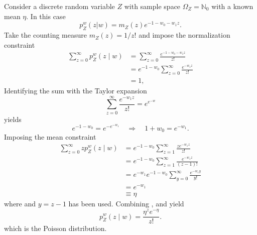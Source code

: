 \begin{example}
	Consider a discrete random variable $Z$ with sample space $\Omega_Z = \mathbb{N}_0$ with a known mean $\eta$. In this case
	\begin{equation}
		p_{Z}^w(z|w) = m_Z(z) e^{-1-w_0 - w_1 z}.
		\label{eq:qsa}
	\end{equation}
	Take the counting measure $m_Z(z) = 1/z!$ and impose the normalization constraint
	\begin{equation}
		\begin{split}
			\sum_{z=0}^{\infty} p_{Z}^w(z \mid w) &= \sum_{z=0}^{\infty} \frac{e^{-1-w_0 - w_1 z}}{z!}\\
			& = e^{-1-w_0} \sum_{z=0}^{\infty} \frac{e^{-w_1 z}}{z!}\\
			& = 1,
		\end{split}
		\label{eq:asd}
	\end{equation}
	Identifying the sum with the Taylor expansion
	\begin{equation}
		\sum_{z=0}^{\infty} \frac{e^{-w_1 z}}{z!} = e^{e^{-w}}
	\end{equation}
	yields
	\begin{equation}
		e^{-1-w_0} = e^{-e^{-w_1}} \quad \Rightarrow \quad 1+w_0 = e^{-w_1}.
		\label{eq:qwe}
	\end{equation}
	Imposing the mean constraint
	\begin{equation}
		\begin{split}
			\sum_{z=0}^{\infty} z p_{Z}^w(z \mid w)& = e^{-1-w_0} \sum_{z=1}^{\infty} \frac{z e^{-w_1 z}}{z!}\\
			& = e^{-1-w_0} \sum_{z=1}^{\infty} \frac{e^{-w_1 z}}{(z-1)!}\\
			& = e^{-w_1} e^{-1-w_0}\sum_{y=0}^{\infty} \frac{e^{-w_1 y}}{y!}\\
			& = e^{-w_1}\\
			& \equiv \eta
		\end{split}
		\label{eq:qty}
	\end{equation}
	where  and $y = z-1$ has been used. Combining ,  and  yield
	\begin{equation}
		p_{Z}^w(z\mid w) = \frac{\eta^ze^{-\eta }}{z!} .
	\end{equation}
	which is the Poisson distribution.
\end{example}



